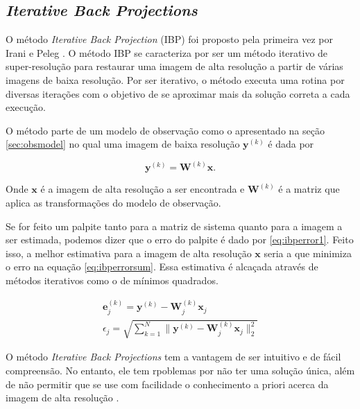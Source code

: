 \subsection{\emph{Iterative Back Projections}}
O método \emph{Iterative Back Projection} (IBP) foi proposto pela primeira vez por Irani e Peleg \cite{irani1991improv}.
O método IBP se caracteriza por ser um método iterativo de super-resolução para restaurar uma imagem de alta resolução a partir de várias imagens de baixa resolução.
Por ser iterativo, o método executa uma rotina por diversas iterações com o objetivo de se aproximar mais da solução correta a cada execução.

O método parte de um modelo de observação como o apresentado na seção \ref{sec:obsmodel} no qual uma imagem de baixa resolução $\mathbf{y}^{(k)}$ é dada por

\begin{equation}
	\mathbf{y}^{(k)} = \mathbf{W}^{(k)} \mathbf{x}.
\end{equation}

Onde $\mathbf{x}$ é a imagem de alta resolução a ser encontrada e $\mathbf{W}^{(k)}$ é a matriz que aplica as transformações do modelo de observação.

Se for feito um palpite tanto para a matriz de sistema quanto para a imagem a ser estimada, podemos dizer que o erro do palpite é dado por \ref{eq:ibperror1}.
Feito isso, a melhor estimativa para a imagem de alta resolução $\mathbf{x}$ seria a que minimiza o erro na equação \ref{eq:ibperrorsum}.
Essa estimativa é alcaçada através de métodos iterativos como o de mínimos quadrados.

\begin{gather}
	\label{eq:ibperror1} \mathbf{e}^{(k)}_j = \mathbf{y}^{(k)}-\mathbf{W}^{(k)}_j \mathbf{x}_j \\
	\label{eq:ibperrorsum} \epsilon_j = \sqrt{\sum^N_{k=1}{\|\mathbf{y}^{(k)}-\mathbf{W}^{(k)}_j \mathbf{x}_j\|^2_2}}
\end{gather}

O método \emph{Iterative Back Projections} tem a vantagem de ser intuitivo e de fácil compreensão.
No entanto, ele tem rpoblemas por não ter uma solução única, além de não permitir que se use com facilidade o conhecimento a priori acerca da imagem de alta resolução \cite{nasrollahi2014super, park2003super}.

